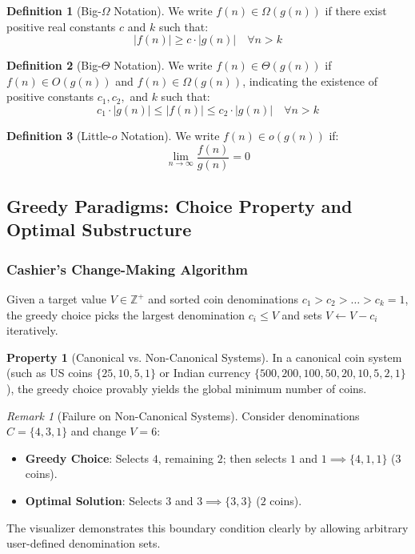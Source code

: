 \documentclass[11pt,a4paper]{article}
\theoremstyle{definition}
\newtheorem{definition}{Definition}[section]
\newtheorem{property}{Property}[section]
\theoremstyle{plain}
\theoremstyle{remark}
\newtheorem{remark}{Remark}[section]
\begin{document}
\begin{definition}[Big-$\Omega$ Notation]
We write $f(n) \in \Omega(g(n))$ if there exist positive real constants $c$ and $k$ such that:
\begin{equation}
|f(n)| \ge c \cdot |g(n)| \quad \forall n > k
\end{equation}
\end{definition}

\begin{definition}[Big-$\Theta$ Notation]
We write $f(n) \in \Theta(g(n))$ if $f(n) \in O(g(n))$ and $f(n) \in \Omega(g(n))$, indicating the existence of positive constants $c_1, c_2,$ and $k$ such that:
\begin{equation}
c_1 \cdot |g(n)| \le |f(n)| \le c_2 \cdot |g(n)| \quad \forall n > k
\end{equation}
\end{definition}

\begin{definition}[Little-$o$ Notation]
We write $f(n) \in o(g(n))$ if:
\begin{equation}
\lim_{n \to \infty} \frac{f(n)}{g(n)} = 0
\end{equation}
\end{definition}

\subsection{Greedy Paradigms: Choice Property and Optimal Substructure}

\subsubsection{Cashier's Change-Making Algorithm}
Given a target value $V \in \mathbb{Z}^+$ and sorted coin denominations $c_1 > c_2 > \dots > c_k = 1$, the greedy choice picks the largest denomination $c_i \le V$ and sets $V \leftarrow V - c_i$ iteratively.

\begin{property}[Canonical vs. Non-Canonical Systems]
In a canonical coin system (such as US coins $\{25, 10, 5, 1\}$ or Indian currency $\{500, 200, 100, 50, 20, 10, 5, 2, 1\}$), the greedy choice provably yields the global minimum number of coins.
\end{property}

\begin{remark}[Failure on Non-Canonical Systems]
Consider denominations $C = \{4, 3, 1\}$ and change $V = 6$:
\begin{itemize}
    \item \textbf{Greedy Choice}: Selects $4$, remaining $2$; then selects $1$ and $1 \implies \{4, 1, 1\}$ ($3$ coins).
    \item \textbf{Optimal Solution}: Selects $3$ and $3 \implies \{3, 3\}$ ($2$ coins).
\end{itemize}
The visualizer demonstrates this boundary condition clearly by allowing arbitrary user-defined denomination sets.
\end{remark}
\end{document}
